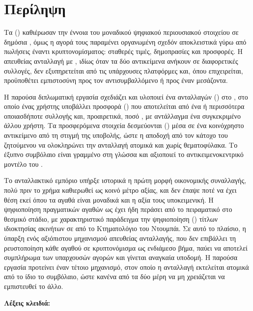 \chapter*{Περίληψη}
Τα  () καθιέρωσαν την έννοια του μοναδικού ψηφιακού
περιουσιακού στοιχείου σε δημόσια , όμως η αγορά τους παραμένει
οργανωμένη σχεδόν αποκλειστικά γύρω από πωλήσεις έναντι κρυπτονομίσματος: σταθερές τιμές,
δημοπρασίες και προσφορές. Η απευθείας ανταλλαγή  με , ιδίως όταν τα δύο
αντικείμενα ανήκουν σε διαφορετικές συλλογές, δεν εξυπηρετείται από τις υπάρχουσες
πλατφόρμες και, όπου επιχειρείται, προϋποθέτει εμπιστοσύνη προς τον αντισυμβαλλόμενο ή
προς έναν μεσάζοντα.

Η παρούσα διπλωματική εργασία σχεδιάζει και υλοποιεί ένα  ανταλλαγών
() στο , στο οποίο ένας χρήστης υποβάλλει προσφορά
() που αποτελείται από ένα ή περισσότερα  οποιασδήποτε συλλογής και,
προαιρετικά, ποσό , με αντάλλαγμα ένα συγκεκριμένο  άλλου χρήστη. Τα
προσφερόμενα στοιχεία δεσμεύονται () μέσα σε ένα κοινόχρηστο αντικείμενο
 από τη στιγμή της υποβολής, ώστε η αποδοχή από τον κάτοχο του ζητούμενου
 να ολοκληρώνει την ανταλλαγή ατομικά και χωρίς θεματοφύλακα. Το έξυπνο συμβόλαιο
είναι γραμμένο στη γλώσσα  και αξιοποιεί το αντικειμενοκεντρικό μοντέλο του
.

Το ανταλλακτικό εμπόριο υπήρξε ιστορικά η πρώτη μορφή οικονομικής συναλλαγής, πολύ πριν
το χρήμα καθιερωθεί ως κοινό μέτρο αξίας, και δεν έπαψε ποτέ να έχει θέση εκεί όπου τα
αγαθά είναι μοναδικά και η αξία τους υποκειμενική. Η ψηφιοποίηση πραγματικών αγαθών ως
 έχει ήδη περάσει από το πειραματικό στο θεσμικό στάδιο, με χαρακτηριστικό
παράδειγμα την ψηφιοποίηση () τίτλων ιδιοκτησίας ακινήτων σε 
από το Κτηματολόγιο του Ντουμπάι. Σε αυτό το
πλαίσιο, η ύπαρξη ενός αξιόπιστου μηχανισμού απευθείας ανταλλαγής, που δεν επιβάλλει τη
ρευστοποίηση κάθε αγαθού σε κρυπτονόμισμα ως ενδιάμεσο βήμα, παύει να αποτελεί
συμπλήρωμα των υπαρχουσών αγορών και γίνεται αναγκαία υποδομή. Η παρούσα εργασία
προτείνει έναν τέτοιο μηχανισμό, στον οποίο η ανταλλαγή εκτελείται ατομικά από το ίδιο
το συμβόλαιο, ώστε κανένα από τα δύο μέρη να μη χρειάζεται να εμπιστευθεί το άλλο.

\vspace{1cm}
\noindent\textbf{Λέξεις κλειδιά:} 
\clearpage
